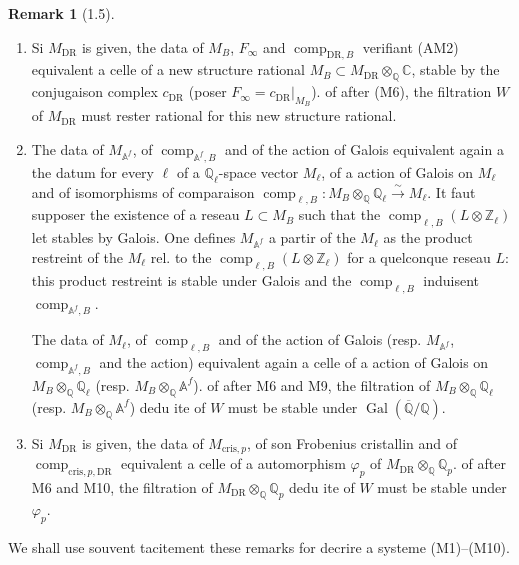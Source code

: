 \documentclass[12pt,a4paper]{article}
\theoremstyle{plain}
\theoremstyle{definition}
\newtheorem{remark}[theorem]{Remark}
\theoremstyle{remark}
\DeclareMathOperator{\Gal}{Gal}
\providecommand{\Gal}{\operatorname{Gal}}
\providecommand{\DR}{\mathrm{DR}}
\providecommand{\cris}{\mathrm{cris}}
\providecommand{\comp}{\operatorname{comp}}
\begin{document}
\begin{remark}[1.5]\label{rem:1.5}
\leavevmode
\begin{enumerate}[label=(\roman*)]
\item Si $M_{\DR}$ is given, the data of $M_B$, $F_\infty$ and $\comp_{\DR,B}$
verifiant (AM2) equivalent a celle of a new structure rational
$M_B \subset M_{\DR} \otimes_{\mathbb{Q}} \mathbb{C}$, stable by the conjugaison complex
$c_{\DR}$ (poser $F_\infty = c_{\DR}|_{M_B}$). of after (M6), the filtration $W$ of
$M_{\DR}$ must rester rational for this new structure rational.

\item The data of $M_{\mathbb{A}^f}$, of $\comp_{\mathbb{A}^f,B}$ and of the action of
Galois equivalent again a the datum for every $\ell$ of a $\mathbb{Q}_\ell$-space
vector $M_\ell$, of a action of Galois on $M_\ell$ and of isomorphisms of comparaison
$\comp_{\ell,B}: M_B \otimes_{\mathbb{Q}} \mathbb{Q}_\ell \xrightarrow{\sim} M_\ell$. It faut
supposer the existence of a reseau $L \subset M_B$ such that the $\comp_{\ell,B}(L \otimes
\mathbb{Z}_\ell)$ let stables by Galois. One defines $M_{\mathbb{A}^f}$ a partir of the
$M_\ell$ as the product restreint of the $M_\ell$ rel. to the $\comp_{\ell,B}(L \otimes
\mathbb{Z}_\ell)$ for a quelconque reseau $L$: this product restreint is stable under
Galois and the $\comp_{\ell,B}$ induisent $\comp_{\mathbb{A}^f,B}$.

The data of $M_\ell$, of $\comp_{\ell,B}$ and of the action of Galois (resp.
$M_{\mathbb{A}^f}$, $\comp_{\mathbb{A}^f,B}$ and the action) equivalent again a celle
of a action of Galois on $M_B \otimes_{\mathbb{Q}} \mathbb{Q}_\ell$ (resp.
$M_B \otimes_{\mathbb{Q}} \mathbb{A}^f$). of after M6 and M9, the filtration of
$M_B \otimes_{\mathbb{Q}} \mathbb{Q}_\ell$ (resp. $M_B \otimes_{\mathbb{Q}} \mathbb{A}^f$) dedu ite of
$W$ must be stable under $\Gal(\overline{\mathbb{Q}}/\mathbb{Q})$.

\item Si $M_{\DR}$ is given, the data of $M_{\cris,p}$, of son Frobenius
cristallin and of $\comp_{\cris,p,\DR}$ equivalent a celle of a automorphism
$\varphi_p$ of $M_{\DR} \otimes_{\mathbb{Q}} \mathbb{Q}_p$. of after M6 and M10, the filtration
of $M_{\DR} \otimes_{\mathbb{Q}} \mathbb{Q}_p$ dedu ite of $W$ must be stable under
$\varphi_p$.
\end{enumerate}
We shall use souvent tacitement these remarks for decrire a systeme
(M1)--(M10).
\end{remark}
\end{document}
